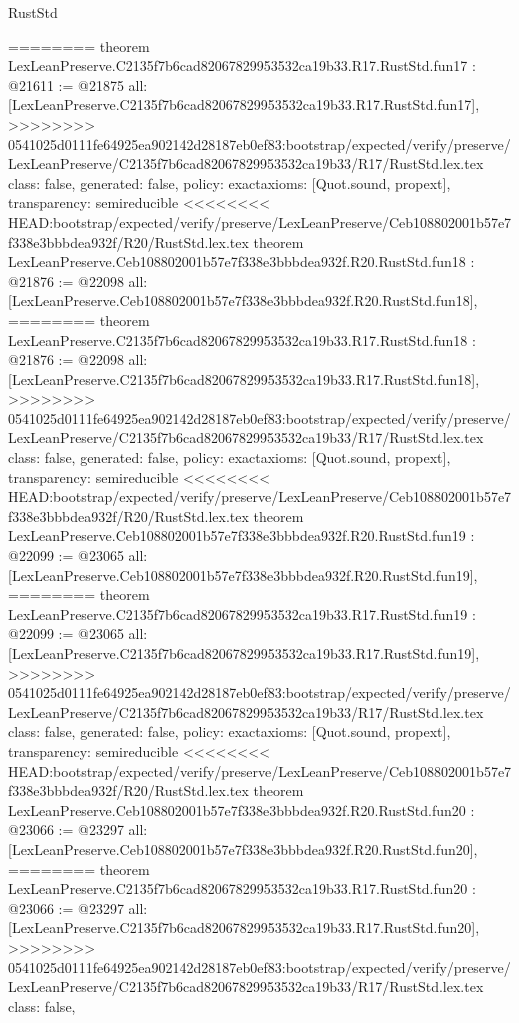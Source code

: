 \begin{lexlean}{RustStd}
\begin{coremodule}
{\begin{coremodule}
{{{{{{{{{{{{{{{{{{{{========
theorem LexLeanPreserve.C2135f7b6cad82067829953532ca19b33.R17.RustStd.fun17 : @21611 := @21875 {
  all: [LexLeanPreserve.C2135f7b6cad82067829953532ca19b33.R17.RustStd.fun17],
>>>>>>>> 0541025d0111fe64925ea902142d28187eb0ef83:bootstrap/expected/verify/preserve/LexLeanPreserve/C2135f7b6cad82067829953532ca19b33/R17/RustStd.lex.tex
  class: false,
  generated: false,
  policy: exact{axioms: [Quot.sound, propext]},
  transparency: semireducible
}
<<<<<<<< HEAD:bootstrap/expected/verify/preserve/LexLeanPreserve/Ceb108802001b57e7f338e3bbbdea932f/R20/RustStd.lex.tex
theorem LexLeanPreserve.Ceb108802001b57e7f338e3bbbdea932f.R20.RustStd.fun18 : @21876 := @22098 {
  all: [LexLeanPreserve.Ceb108802001b57e7f338e3bbbdea932f.R20.RustStd.fun18],
========
theorem LexLeanPreserve.C2135f7b6cad82067829953532ca19b33.R17.RustStd.fun18 : @21876 := @22098 {
  all: [LexLeanPreserve.C2135f7b6cad82067829953532ca19b33.R17.RustStd.fun18],
>>>>>>>> 0541025d0111fe64925ea902142d28187eb0ef83:bootstrap/expected/verify/preserve/LexLeanPreserve/C2135f7b6cad82067829953532ca19b33/R17/RustStd.lex.tex
  class: false,
  generated: false,
  policy: exact{axioms: [Quot.sound, propext]},
  transparency: semireducible
}
<<<<<<<< HEAD:bootstrap/expected/verify/preserve/LexLeanPreserve/Ceb108802001b57e7f338e3bbbdea932f/R20/RustStd.lex.tex
theorem LexLeanPreserve.Ceb108802001b57e7f338e3bbbdea932f.R20.RustStd.fun19 : @22099 := @23065 {
  all: [LexLeanPreserve.Ceb108802001b57e7f338e3bbbdea932f.R20.RustStd.fun19],
========
theorem LexLeanPreserve.C2135f7b6cad82067829953532ca19b33.R17.RustStd.fun19 : @22099 := @23065 {
  all: [LexLeanPreserve.C2135f7b6cad82067829953532ca19b33.R17.RustStd.fun19],
>>>>>>>> 0541025d0111fe64925ea902142d28187eb0ef83:bootstrap/expected/verify/preserve/LexLeanPreserve/C2135f7b6cad82067829953532ca19b33/R17/RustStd.lex.tex
  class: false,
  generated: false,
  policy: exact{axioms: [Quot.sound, propext]},
  transparency: semireducible
}
<<<<<<<< HEAD:bootstrap/expected/verify/preserve/LexLeanPreserve/Ceb108802001b57e7f338e3bbbdea932f/R20/RustStd.lex.tex
theorem LexLeanPreserve.Ceb108802001b57e7f338e3bbbdea932f.R20.RustStd.fun20 : @23066 := @23297 {
  all: [LexLeanPreserve.Ceb108802001b57e7f338e3bbbdea932f.R20.RustStd.fun20],
========
theorem LexLeanPreserve.C2135f7b6cad82067829953532ca19b33.R17.RustStd.fun20 : @23066 := @23297 {
  all: [LexLeanPreserve.C2135f7b6cad82067829953532ca19b33.R17.RustStd.fun20],
>>>>>>>> 0541025d0111fe64925ea902142d28187eb0ef83:bootstrap/expected/verify/preserve/LexLeanPreserve/C2135f7b6cad82067829953532ca19b33/R17/RustStd.lex.tex
  class: false,
}}}}}}}}}}}}}}}}}}}}}}}}
\end{coremodule}}
\end{coremodule}
\end{lexlean}
